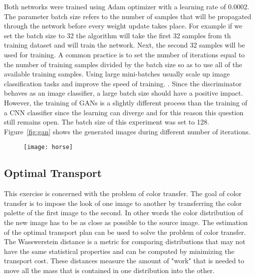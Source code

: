 \documentclass[conference,compsoc]{IEEEtran}
\begin{document}
Both networks were trained using Adam optimizer with a learning rate of 0.0002. The parameter batch size refers to the number of samples that will be propagated through the network before every weight update takes place. For example if we set the batch size to 32 the algorithm will take the first 32 samples from th training dataset and will train the network. Next, the second 32 samples will be used for training. A common practice is to set the number of iterations equal to the number of training samples divided by the batch size so as to use all of the available training samples. Using large mini-batches usually scale up image classification tasks and improve the speed of training. \cite{large}. Since the discriminator behaves as an image classifier, a large batch size should have a positive impact. However, the training of GANs is a slightly different process than the training of a CNN classifier since the learning can diverge and for this reason  this question still remains open.
The batch size of this experiment was set to 128. Figure~\ref{fig:gan} shows the generated images during different number of iterations. 


    \begin{figure*}[]
        \centering
     \begin{subfigure}{16cm}
          \texttt{[image: horse]}
     \end{subfigure}

     
		        
        \caption{Synthetically generated images of horses}
        \label{fig:gan}
\end{figure*}



\subsection{Optimal Transport}
This exercise is concerned with the problem of color transfer. The goal of color transfer is to impose the look of one image to another by transferring the color palette of the first image to the second.
In other words the color distribution of the new image has to be as close as possible to the source image. The estimation of the optimal transport plan can be used to solve the problem of color transfer. The Wasswerstein distance is a metric for comparing distributions that may not have the same statistical properties and can be computed by minimizing the transport cost. These distances measure the amount of "work" that is needed to move all the mass that is contained in one distribution into the other.
\end{document}
